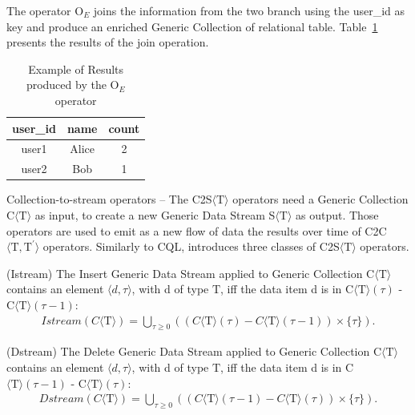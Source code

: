 {The operator O$_E$ joins the information from the two branch using the user\_id as key and produce an enriched Generic Collection of relational table. Table~\ref{tbl:oe_res} presents the results of the join operation.

\begin{table}[ht]
\centering
\caption{Example of Results produced by the O$_E$ operator}
\label{tbl:oe_res}
    \begin{tabular}{|c|c|c|}
        \hline
        \textbf{user\_id} & \textbf{name} & \textbf{count} \\ \hline
        user1             & Alice         & 2              \\ \hline
        user2             & Bob           & 1              \\ \hline
    \end{tabular}
\end{table}

\medskip

\textsf{Collection-to-stream operators} -- The C2S$\langle\mathrm{T}\rangle$ operators need a Generic Collection C$\langle\mathrm{T}\rangle$ as input, to create a new Generic Data Stream S$\langle\mathrm{T}\rangle$ as output. 
Those operators are used to emit as a new flow of data the results over time of C2C$\langle\mathrm{T},\mathrm{T^{\prime}}\rangle$ operators. 
Similarly to CQL, \river{} introduces three classes of C2S$\langle\mathrm{T}\rangle$ operators.

\begin{Definition}
(Istream) The Insert Generic Data Stream applied to Generic Collection C$\langle\mathrm{T}\rangle$ contains an element $\langle d,\tau \rangle$, with d of type $\mathrm{T}$, iff the data item d is in C$\langle\mathrm{T}\rangle(\tau)$ - C$\langle\mathrm{T}\rangle(\tau - 1)$: 
\noindent\begin{align*}
Istream(C\langle\mathrm{T}\rangle) = \bigcup_{\tau \geq 0} ((C\langle\mathrm{T}\rangle(\tau) - C\langle\mathrm{T}\rangle(\tau - 1)) \times \{\tau\}).
\end{align*} 
\end{Definition}

\begin{Definition}
(Dstream) The Delete Generic Data Stream applied to Generic Collection C$\langle\mathrm{T}\rangle$ contains an element $\langle d,\tau \rangle$, with d of type $\mathrm{T}$, iff the data item d is in C$\langle\mathrm{T}\rangle(\tau - 1)$ - C$\langle\mathrm{T}\rangle(\tau)$: 
\noindent\begin{align*}
Dstream(C\langle\mathrm{T}\rangle) = \bigcup_{\tau \geq 0} ((C\langle\mathrm{T}\rangle(\tau - 1) - C\langle\mathrm{T}\rangle(\tau)) \times \{\tau\}).
\end{align*} 
\end{Definition}

}
